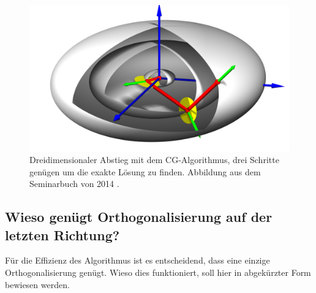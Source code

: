 \begin{figure}	
	\centering
	\includegraphics[width=0.8\hsize]{papers/cg/images/cg3d-large.jpg}
	\caption{Dreidimensionaler Abstieg mit dem CG-Algorithmus, drei Schritte genügen um die exakte Lösung zu finden. 
		Abbildung aus dem Seminarbuch von 2014 \cite{cg:book:hpc}.}
	\label{cg:abb:cg2}
\end{figure}

\subsection{Wieso genügt Orthogonalisierung auf der letzten Richtung?}
Für die Effizienz des Algorithmus ist es entscheidend, dass eine einzige Orthogonalisierung genügt.
Wieso dies funktioniert, soll hier in abgekürzter Form bewiesen werden.

